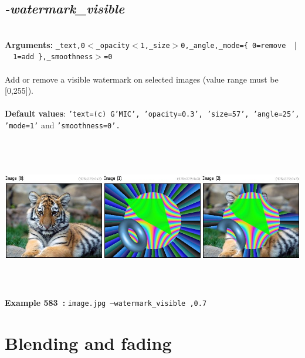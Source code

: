 \documentclass[a4paper,11pt,twoside]{book}
\begin{document}
\subsection{\emph{-watermark\_visible} }\vspace*{-0.5em}
~\\\textbf{Arguments: } 
{\small \texttt{\_text,0$<$\_opacity$<$1,\_size$>$0,\_angle,\_mode=\{ 0=remove ~$|$~ 1=add \},\_smoothness$>$=0}}\\~\\
Add or remove a visible watermark on selected images (value range must be [0,255]).
~\\~\\\textbf{Default values}: {\small \texttt{'text=(c) G'MIC', 'opacity=0.3', 'size=57', 'angle=25', 'mode=1'} and \texttt{'smoothness=0'.}}
\begin{center}\includegraphics[keepaspectratio=true,height=7cm,width=\textwidth]{img/gmic_def583.jpg}\\
{\footnotesize \textbf{Example 583~:} \texttt{image.jpg --watermark\_visible ,0.7}}
\end{center}
\section{Blending and fading}
\end{document}
